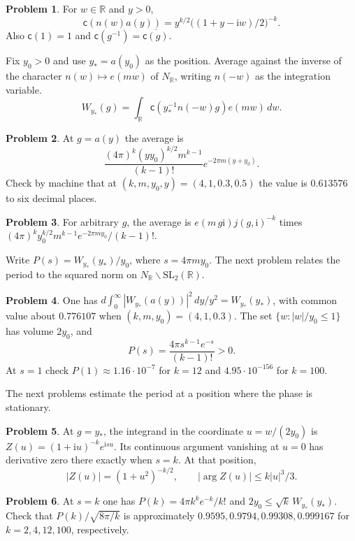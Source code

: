\documentclass[reqno]{amsart}
\theoremstyle{definition}
\newtheorem{problem}{Problem}[section]
\theoremstyle{plain}
\theoremstyle{remark}
\newcommand{\R}{\mathbb R}
\newcommand{\ii}{\mathrm i}
\newcommand{\cf}{\mathsf c}
\begin{document}
\begin{problem}\label{pr:half-coeff}
For \(w\in\R\) and \(y>0\),
\[
 \cf(n(w)a(y))=y^{k/2}\bigl((1+y-\ii w)/2\bigr)^{-k}.
\]
Also \(\cf(1)=1\) and \(\cf(g^{-1})=\overline{\cf(g)}\).
\end{problem}

Fix \(y_0>0\) and use \(y_*=a(y_0)\) as the position.  Average against the inverse of the character \(n(w)\mapsto e(mw)\) of \(N_{\R}\), writing \(n(-w)\) as the integration variable.
\[
 W_{y_*}(g)=\int_{\R}\cf(y_*^{-1}n(-w)g)e(mw)\,dw .
\]

\begin{problem}\label{pr:half-integral}
At \(g=a(y)\) the average is
\[
 \frac{(4\pi)^k(yy_0)^{k/2}m^{k-1}}{(k-1)!}
       e^{-2\pi m(y+y_0)} .
\]
Check by machine that at \((k,m,y_0,y)=(4,1,0.3,0.5)\) the value is \(0.613576\) to six decimal places.
\end{problem}

\begin{problem}\label{pr:seed}
For arbitrary \(g\), the average is \(e(m\,g\ii)j(g,\ii)^{-k}\) times \((4\pi)^k y_0^{k/2}m^{k-1}e^{-2\pi my_0}/(k-1)!\).
\end{problem}

Write \(P(s)=W_{y_*}(y_*)/y_0\), where \(s=4\pi my_0\).  The next problem relates the period to the squared norm on \(N_{\R}\backslash\mathrm{SL}_2(\R)\).

\begin{problem}\label{pr:half-norm}
One has \(d\int_0^\infty |W_{y_*}(a(y))|^2\,dy/y^2=W_{y_*}(y_*)\), with common value about \(0.776107\) when \((k,m,y_0)=(4,1,0.3)\).  The set \(\{w: |w|/y_0\le1\}\) has volume \(2y_0\), and
\[
 P(s)=\frac{4\pi s^{k-1}e^{-s}}{(k-1)!}>0.
\]
At \(s=1\) check \(P(1)\approx1.16\cdot10^{-7}\) for \(k=12\) and \(4.95\cdot10^{-156}\) for \(k=100\).
\end{problem}

The next problems estimate the period at a position where the phase is stationary.

\begin{problem}\label{pr:stationary}
At \(g=y_*\), the integrand in the coordinate \(u=w/(2y_0)\) is \(Z(u)=(1+\ii u)^{-k}e^{\ii s u}\).  Its continuous argument vanishing at \(u=0\) has derivative zero there exactly when \(s=k\).  At that position,
\[
 |Z(u)|=(1+u^2)^{-k/2},\qquad |\arg Z(u)|\le k|u|^3/3 .
\]
\end{problem}

\begin{problem}\label{pr:stirling}
At \(s=k\) one has \(P(k)=4\pi k^k e^{-k}/k!\) and \(2y_0\le\sqrt{k}\,W_{y_*}(y_*)\).  Check that \(P(k)/\sqrt{8\pi/k}\) is approximately \(0.9595,0.9794,0.99308,0.999167\) for \(k=2,4,12,100\), respectively.
\end{problem}
\end{document}
